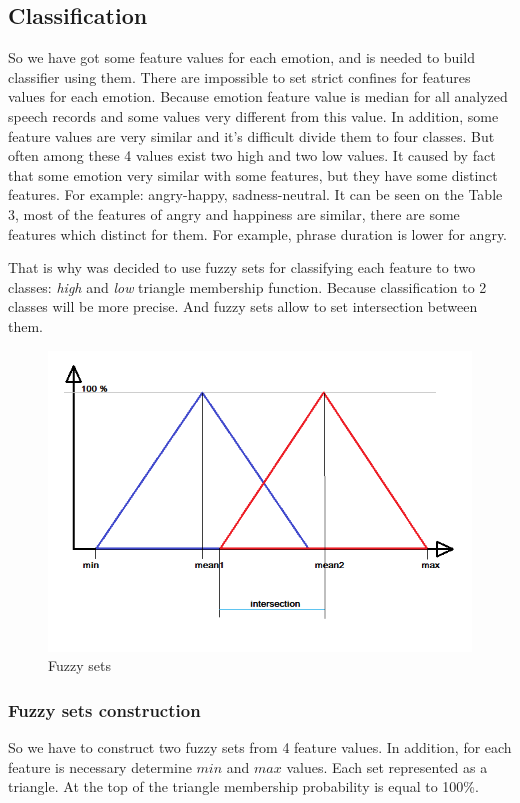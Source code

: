 \documentclass[12pt, letterpaper]{article}
\begin{document}
\subsection{Classification}
So we have got some feature values for each emotion, and is needed to build classifier using them. There are impossible to set strict confines for features values for each emotion. Because emotion feature value is median for all analyzed speech records and some values very different from this value. In addition, some feature values are very similar and it's difficult divide them to four classes. But often among these 4 values exist two high and two low values. It caused by fact that some emotion very similar with some features, but they have some distinct features.
For example: angry-happy, sadness-neutral. It can be seen on the Table 3, most of the features of angry and happiness are similar, there are some features which distinct for them. For example, phrase duration is lower for angry.

That is why was decided to use fuzzy sets for classifying each feature to two classes: \emph{high} and \emph{low} triangle membership function.  Because classification to 2 classes will be more precise. And fuzzy sets allow to set intersection between them.
\begin{figure}[t]
	\centering
		\includegraphics[scale=0.7]{images/fuzzy-sets.png}
	\caption{Fuzzy sets}
	\label{fig:fuzzy-sets}
\end{figure}

\subsubsection{Fuzzy sets construction}
So we have to construct two fuzzy sets from 4 feature values. In addition, for each feature is necessary determine $min$ and $max$ values. Each set represented as a triangle. At the top of the triangle membership probability is equal to 100\%. 
\end{document}
